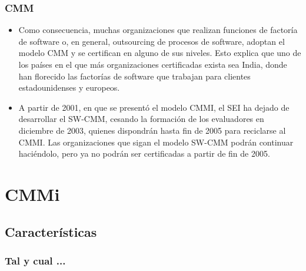 \documentclass{beamer}
\begin{document}
\frame
{
  \frametitle{CMM}
  \begin{itemize}
    \item<1-> Como consecuencia, muchas organizaciones que realizan funciones de factoría de
software o, en general, outsourcing de procesos de software, adoptan el modelo
CMM y se certifican en alguno de sus niveles. Esto explica que uno de los países en
el que más organizaciones certificadas exista sea India, donde han florecido las
factorías de software que trabajan para clientes estadounidenses y europeos.

    \item<2-> A partir de 2001, en que se presentó el modelo CMMI, el SEI ha dejado de
desarrollar el SW-CMM, cesando la formación de los evaluadores en diciembre de
2003, quienes dispondrán hasta fin de 2005 para reciclarse al CMMI. Las
organizaciones que sigan el modelo SW-CMM podrán continuar haciéndolo, pero ya
no podrán ser certificadas a partir de fin de 2005.


  \end{itemize}
}

\section{CMMi}
\subsection{Características}
\frame
{
  \frametitle{Tal y cual ...}
}
\end{document}

